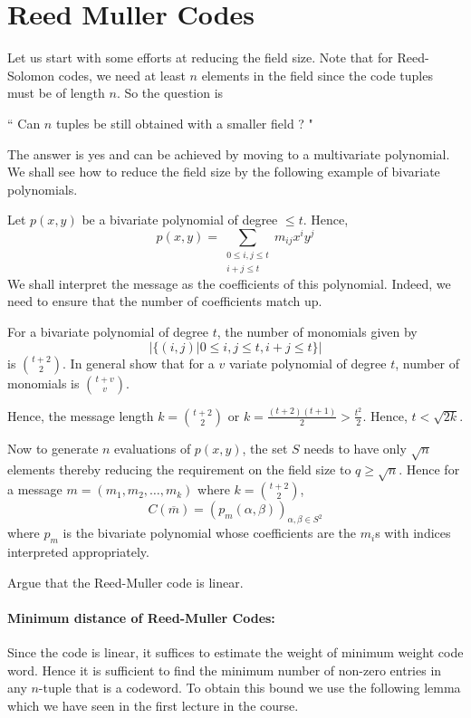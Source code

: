 \section{Reed Muller Codes}
Let us start with some efforts at  reducing the field size. Note that for
Reed-Solomon codes, we need at least $n$ elements in the field since the code
tuples must be of length $n$. So the question is 
\begin{center}
`` Can $n$ tuples be still obtained with a smaller field ? "
\end{center}
The answer is yes and can be achieved by moving to a multivariate polynomial.
We shall see how to reduce the field size by the following example of bivariate polynomials.

Let $p(x,y)$ be a bivariate polynomial of degree $\le t$. Hence,
\[ p(x,y) = \sum_{\substack{0 \le i,j \le t \\ i+j \le t}} m_{ij} x^iy^j \]
We shall interpret the message as the coefficients of this polynomial. Indeed, we need to ensure that the number of coefficients match up.
\begin{exercise}
For a bivariate polynomial of degree $t$, the number of
monomials given by 
\[\left |\{(i,j)| 0\le i,j\le t, i+j \le t \} \right | \]
is $\binom{t+2}{2}$. In general show that for a $v$ variate polynomial of
degree $t$, number of monomials is $\binom{t+v}{v}$.
\end{exercise}

\noindent Hence, the message length $k = \binom{t+2}{2}$ or $k = \frac{(t+2)(t+1)}{2} > \frac{t^2}{2}$. Hence, $t < \sqrt{2k}$.

Now to generate $n$ evaluations of $p(x,y)$, the set $S$ needs to have only
$\sqrt{n}$ elements thereby reducing the requirement on the field size to $q \ge \sqrt{n}$. Hence for a message
$m = (m_1,m_2,\ldots,m_k)$ where $k = \binom{t+2}{2}$, 
\[ C(\overline{m}) = \left ( p_m(\alpha, \beta) \right )_{\alpha,\beta \in S^2}
\]
where $p_m$ is the bivariate polynomial whose coefficients are the $m_i$s with indices interpreted appropriately.

\begin{exercise}
Argue that the Reed-Muller code is linear.
\end{exercise}

\paragraph{Minimum distance of Reed-Muller Codes:}
Since the code is linear, it suffices to estimate the weight of minimum weight code word. Hence it is sufficient to find the minimum number of non-zero entries in any $n$-tuple that is a codeword. To obtain this bound we use the following lemma which we have seen in the first lecture in the course.

